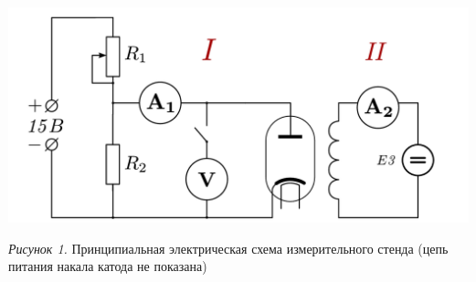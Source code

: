 \hypertarget{schema1}{}

\begin{center}
    \includegraphics[width=15cm]{images/scheme1}

    \smallvspace

    \textit{Рисунок 1.} Принципиальная электрическая схема измерительного стенда
    (цепь питания накала катода не показана)
\end{center}




